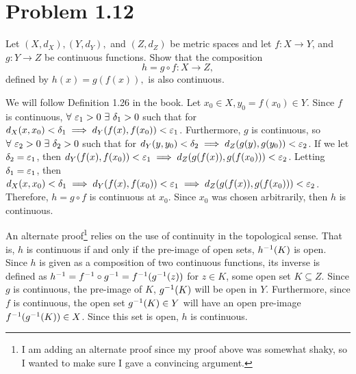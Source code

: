 \newpage
\section{Problem 1.12}
Let $(X, d_X), (Y, d_Y),$ and $(Z, d_Z)$ be metric spaces and let $f: X \rightarrow Y$, and $g: Y \rightarrow Z$ be continuous functions. Show that the composition
$$h = g\circ f: X\rightarrow Z,$$
defined by $h(x) = g(f(x)),$ is also continuous.
\partbreak
\begin{solution}

    We will follow Definition 1.26 in the book. Let $x_0 \in X, y_0 = f(x_0) \in Y$. Since $f$ is continuous, $\forall \ \ep_1 > 0 \ \exists \ \delta_1 > 0$ such that for $d_X(x, x_0) < \delta_1 \implies d_Y(f(x), f(x_0)) < \varepsilon_1$. Furthermore, $g$ is continuous, so $\forall \ \ep_2 > 0 \ \exists \ \delta_2 > 0$ such that for $d_Y(y, y_0) < \delta_2 \implies d_Z(g(y), g(y_0)) < \varepsilon_2$. If we let $\delta_2 = \varepsilon_1$, then $d_Y(f(x), f(x_0)) < \varepsilon_1 \implies d_Z(g(f(x)), g(f(x_0))) < \varepsilon_2$. Letting $\delta_1 = \varepsilon_1$, then $d_X(x, x_0) < \delta_1 \implies d_Y(f(x), f(x_0)) < \varepsilon_1 \implies d_Z(g(f(x)), g(f(x_0))) < \varepsilon_2$. Therefore, $h = g\circ f$ is continuous at $x_0$. Since $x_0$ was chosen arbitrarily, then $h$ is continuous. \hfill \square

    \jump
    An alternate proof\footnote{I am adding an alternate proof since my proof above was somewhat shaky, so I wanted to make sure I gave a convincing argument.} relies on the use of continuity in the topological sense. That is, $h$ is continuous if and only if the pre-image of open sets, $h^{-1} (K)$ is open. Since $h$ is given as a composition of two continuous functions, its inverse is defined as $h^{-1} = f^{-1} \circ g^{-1} = f^{-1} (g^{-1}(z))$ for $z \in K$, some open set $K \subseteq Z$. Since $g$ is continuous, the pre-image of $K$, $g^{-1} (K)$ will be open in $Y$. Furthermore, since $f$ is continuous, the open set $g^{-1} (K) \in Y$ will have an open pre-image $f^{-1} (g^{-1} (K)) \in X$. Since this set is open, $h$ is continuous. \hfill \square
\end{solution}

\newpage
